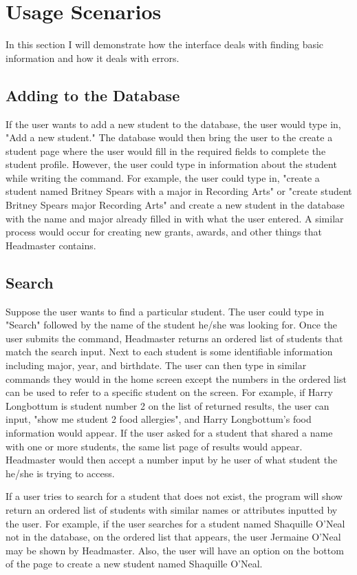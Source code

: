 \documentclass{article}
\begin{document}
\section{Usage Scenarios}
In this section I will demonstrate how the interface deals with finding basic information and how it deals with errors. 

\subsection{Adding to the Database}
If the user wants to add a new student to the database, the user would type in, "Add a new student." The database would then bring the user to the create a student page where the user would fill in the required fields to complete the student profile. However, the user could type in information about the student while writing the command. For example, the user could type in, "create a student named Britney Spears with a major in Recording Arts" or "create student Britney Spears major Recording Arts" and create a new student in the database with the name and major already filled in with what the user entered. A similar process would occur for creating new grants, awards, and other things that Headmaster contains.

\subsection{Search}
Suppose the user wants to find a particular student. The user could type in "Search" followed by the name of the student he/she was looking for. Once the user submits the command, Headmaster returns an ordered list of students that match the search input. Next to each student is some identifiable information including major, year, and birthdate. The user can then type in similar commands they would in the home screen except the numbers in the ordered list can be used to refer to a specific student on the screen. For example, if Harry Longbottum is student number 2 on the list of returned results, the user can input, "show me student 2 food allergies", and Harry Longbottum's food information would appear. If the user asked for a student that shared a name with one or more students, the same list page of results would appear. Headmaster would then accept a number input by he user of what student the he/she is trying to access. 

If a user tries to search for a student that does not exist, the program will show return an ordered list of students with similar names or attributes inputted by the user. For example, if the user searches for a student named Shaquille O'Neal not in the database, on the ordered list that appears, the user Jermaine O'Neal may be shown by Headmaster. Also, the user will have an option on the bottom of the page to create a new student named Shaquille O'Neal.
\end{document}
